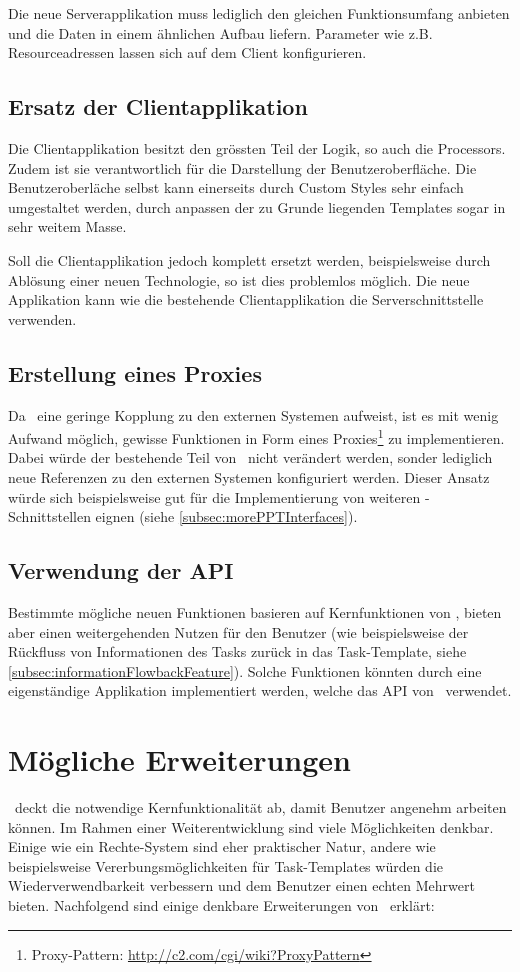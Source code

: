			Die neue Serverapplikation muss lediglich den gleichen Funktionsumfang anbieten und die Daten in einem ähnlichen Aufbau liefern.
			Parameter wie z.B. Resourceadressen lassen sich auf dem Client konfigurieren. 
	
		\subsection{Ersatz der Clientapplikation}
			Die Clientapplikation besitzt den grössten Teil der Logik, so auch die Processors.
			Zudem ist sie verantwortlich für die Darstellung der Benutzeroberfläche.
			Die Benutzeroberläche selbst kann einerseits durch Custom Styles sehr einfach umgestaltet werden, durch anpassen der zu Grunde liegenden Templates sogar in sehr weitem Masse.
			
			Soll die Clientapplikation jedoch komplett ersetzt werden, beispielsweise durch Ablösung einer neuen Technologie, so ist dies problemlos möglich.
			Die neue Applikation kann wie die bestehende Clientapplikation die Serverschnittstelle verwenden.
			

		\subsection{Erstellung eines Proxies}
			Da \eeppi\ eine geringe Kopplung zu den externen Systemen aufweist,
			 ist es mit wenig Aufwand möglich,
			gewisse Funktionen in Form eines Proxies\footnote{Proxy-Pattern: \url{http://c2.com/cgi/wiki?ProxyPattern}} zu implementieren.
			Dabei würde der bestehende Teil von \eeppi\ nicht verändert werden,
			sonder lediglich neue Referenzen zu den externen Systemen konfiguriert werden.
			Dieser Ansatz würde sich beispielsweise gut für die Implementierung von weiteren \ppt-Schnittstellen eignen (siehe \ref{subsec:morePPTInterfaces}).
			
		\subsection{Verwendung der API}
			Bestimmte mögliche neuen Funktionen basieren auf Kernfunktionen von \eeppi,
			bieten aber einen weitergehenden Nutzen für den Benutzer
			(wie beispielsweise der Rückfluss von Informationen des Tasks zurück in das Task-Template, siehe \ref{subsec:informationFlowbackFeature}).
			Solche Funktionen könnten durch eine eigenständige Applikation implementiert werden,
			welche das API von \eeppi\ verwendet.


	\section{Mögliche Erweiterungen}
	\label{sec:possibleExtensions}
		\eeppi\ deckt die notwendige Kernfunktionalität ab, damit Benutzer angenehm arbeiten können.
		Im Rahmen einer Weiterentwicklung sind viele Möglichkeiten denkbar. 
		Einige wie ein Rechte-System sind eher praktischer Natur, 
		andere wie beispielsweise Vererbungsmöglichkeiten für Task-Templates würden die Wiederverwendbarkeit verbessern und dem Benutzer einen echten Mehrwert bieten.
		Nachfolgend sind einige denkbare Erweiterungen von \eeppi\ erklärt:
		
